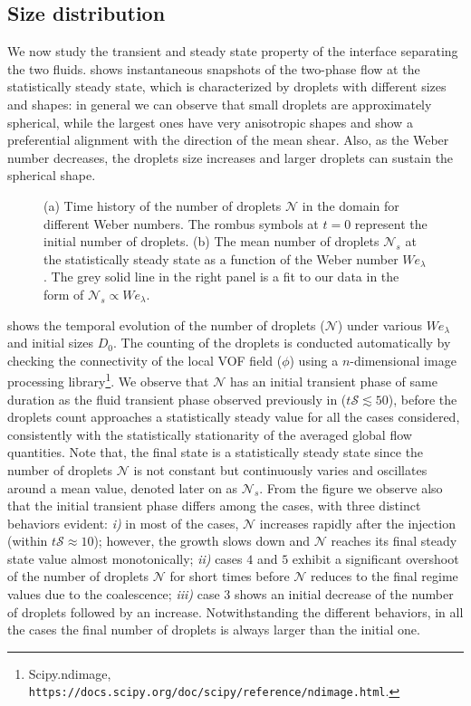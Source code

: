 \subsection{Size distribution}
We now study the transient and steady state property of the interface separating the two fluids.  shows instantaneous snapshots of the two-phase flow at the statistically steady state, which is characterized by droplets with different sizes and shapes: in general we can observe that small droplets are approximately spherical, while the largest ones have very anisotropic shapes and show a preferential alignment with the direction of the mean shear. Also, as the Weber number decreases, the droplets size increases and larger droplets can sustain the spherical shape.

\begin{figure}
	\centering
	 \hspace{0.5cm}
	 \vspace{0.5cm}
	\caption{(a) Time history of the number of droplets $\mathcal{N}$ in the domain for different Weber numbers. The rombus symbols at $t=0$ represent the initial number of droplets. (b) The mean number of droplets $\mathcal{N}_s$ at the statistically steady state as a function of the Weber number $We_\lambda$. The grey solid line in the right panel is a fit to our data in the form of $\mathcal{N}_s \propto We_\lambda$.}
	\label{fig:count}
\end{figure}

 shows the temporal evolution of the number of droplets ($\mathcal{N}$) under various $We_\lambda$ and initial sizes $D_0$. The counting of the droplets is conducted automatically by checking the connectivity of the local VOF field ($\phi$) using a $n$-dimensional image processing library\footnote{Scipy.ndimage, \texttt{https://docs.scipy.org/doc/scipy/reference/ndimage.html}.}. We observe that $\mathcal{N}$ has an initial transient phase of same duration as the fluid transient phase observed previously in  ($t\mathcal{S} \lesssim 50$), before the droplets count approaches a statistically steady value for all the cases considered, consistently with the statistically stationarity of the averaged global flow quantities. Note that, the final state is a statistically steady state since the number of droplets $\mathcal{N}$ is not constant but continuously varies and oscillates around a mean value, denoted later on as $\mathcal{N}_s$. From the figure we observe also that the initial transient phase differs among the cases, with three distinct behaviors evident: \textit{i)} in most of the cases, $\mathcal{N}$ increases rapidly after the injection (within $t \mathcal{S} \approx 10$); however, the growth slows down and $\mathcal{N}$ reaches its final steady state value almost monotonically; \textit{ii)} cases $4$ and $5$ exhibit a significant overshoot of the number of droplets $\mathcal{N}$ for short times before $\mathcal{N}$ reduces to the final regime values due to the coalescence; \textit{iii)} case $3$ shows an initial decrease of the number of droplets followed by an increase. Notwithstanding the different behaviors, in all the cases the final number of droplets is always larger than the initial one. 

